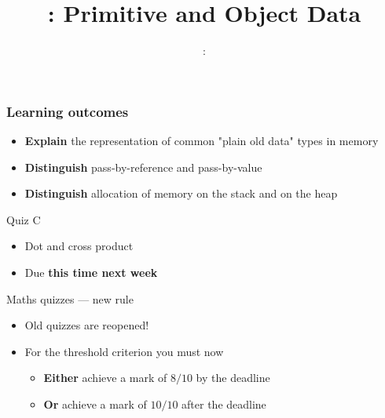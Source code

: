 \usepackage{../../beamerthemeFalmouthGamesAcademy}
\usepackage{multimedia}
\graphicspath{ {../../} }

\lstset{language=Python
}

\usepackage[normalem]{ulem}
\usepackage{wasysym}

\usepackage{algpseudocode}

\usepackage{pdfpages}

\usetikzlibrary{arrows,automata}
\usetikzlibrary{tikzmark,calc}




\title{\sessionnumber: Primitive and Object Data}
\subtitle{\modulecode: \moduletitle}

\frame{\titlepage} 

\begin{frame}
	\frametitle{Learning outcomes}
	\begin{itemize}
      \item \textbf{Explain} the representation of common "plain old data" types in memory
			\item \textbf{Distinguish} pass-by-reference and pass-by-value
			\item \textbf{Distinguish} allocation of memory on the stack and on the heap
	\end{itemize}
\end{frame}

\begin{frame}{Quiz C}
	\begin{itemize}
		\item Dot and cross product
		\item Due \textbf{this time next week}
	\end{itemize}
\end{frame}

\begin{frame}{Maths quizzes --- new rule}
	\begin{itemize}
		\item Old quizzes are reopened!
		\item For the threshold criterion you must now
			\begin{itemize}
				\item \textbf{Either} achieve a mark of $8/10$ by the deadline
				\item \textbf{Or} achieve a mark of $10/10$ after the deadline
			\end{itemize}
	\end{itemize}
\end{frame}






